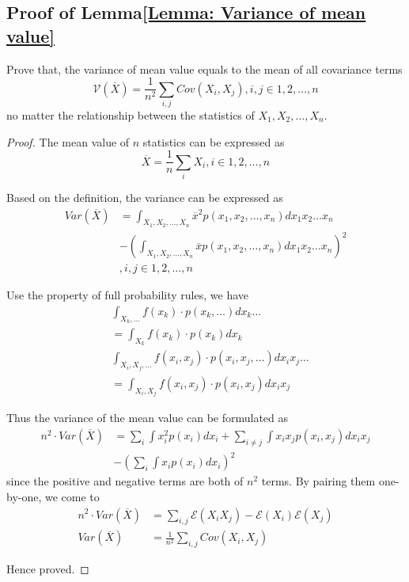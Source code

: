 \documentclass[../main.tex]{subfiles}
\begin{document}
\subsection{Proof of Lemma\ref{Lemma: Variance of mean value}}
Prove that, the variance of mean value equals to the mean of all covariance terms
\begin{equation*}
    \mathcal{V}(\overline{X}) =
    \frac{1}{n^2} \sum_{i, j} Cov(X_i, X_j),
    i, j \in 1, 2, \dots, n
\end{equation*}
no matter the relationship between the statistics of $X_1, X_2, \dots, X_n$.

\begin{proof}
    The mean value of $n$ statistics can be expressed as
    \begin{equation*}
        \overline{X} = \frac{1}{n} \sum_{i} X_i,
        i \in 1, 2, \dots, n
    \end{equation*}

    Based on the definition, the variance can be expressed as
    \begin{align*}
        Var(\overline{X}) & =  \int_{X_1, X_2, \dots, X_n} {\overline{x}}^2 p(x_1, x_2, \dots, x_n) dx_1 x_2 \dots x_n \\
                          & - (\int_{X_1, X_2, \dots, X_n} \overline{x} p(x_1, x_2, \dots, x_n) dx_1 x_2 \dots x_n)^2  \\
                          & , i, j \in 1, 2, \dots, n
    \end{align*}

    Use the property of full probability rules, we have
    \begin{align*}
         & \int_{X_k, \dots} f(x_k) \cdot p(x_k, \dots) dx_k \dots                    \\
         & = \int_{X_k} f(x_k) \cdot p(x_k) dx_k                                      \\
         & \int_{X_i, X_j, \dots} f(x_i, x_j) \cdot p(x_i, x_j, \dots) dx_i x_j \dots \\
         & = \int_{X_i, X_j} f(x_i, x_j) \cdot p(x_i, x_j) dx_i x_j
    \end{align*}

    Thus the variance of the mean value can be formulated as
    \begin{align*}
        n^2 \cdot Var(\overline{X}) & = \sum_i \int x_i^2 p(x_i) dx_i + \sum_{i \neq j} \int x_i x_j p(x_i, x_j) dx_i x_j \\
                                    & - (\sum_i \int x_i p(x_i) dx_i)^2
    \end{align*}
    since the positive and negative terms are both of $n^2$ terms.
    By pairing them one-by-one, we come to
    \begin{align*}
        n^2 \cdot Var(\overline{X}) & = \sum_{i, j} \mathcal{E}(X_i X_j) - \mathcal{E}(X_i)\mathcal{E}(X_j) \\
        Var(\overline{X})           & = \frac{1}{n^2} \sum_{i, j} Cov(X_i, X_j)
    \end{align*}

    Hence proved.
\end{proof}
\end{document}
